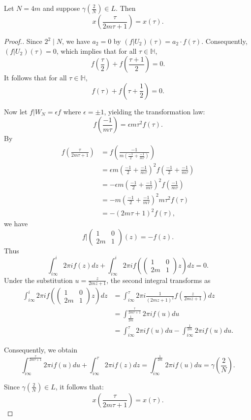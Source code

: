 \documentclass[10pt,a4paper]{amsart}
\begin{document}
\begin{lemma}
Let $N = 4m$ and suppose $\gamma\left(\frac{2}{N}\right) \in L$. Then
\begin{equation}
x\left(\frac{\tau}{2m\tau + 1}\right) = x(\tau).\end{equation}
\end{lemma}

\begin{proof}[Proof.]
Since $2^2 \mid N$, we have $a_2 = 0$  by $(f|U_2)(\tau) =
a_2\cdot f(\tau)$. Consequently,  $(f|U_2)(\tau) = 0$, which implies that for all $\tau \in \mathbb{H}$,
\[ f\left(\frac{\tau}{2}\right) + f\left(\frac{\tau + 1}{2}\right) = 0. \]
It follows that for all $\tau \in \mathbb{H}$,
\[ f(\tau) + f\left(\tau + \frac{1}{2}\right) = 0. \]

Now let $f|W_N = \epsilon f$ where $\epsilon = \pm 1$, yielding the transformation law:
\[ f\left(\frac{-1}{m\tau}\right) = \epsilon m\tau^2 f(\tau). \]
By
\begin{align*}
f\left(\frac{\tau}{2m\tau+1}\right) &= f\left(\frac{-1}{m\left(\frac{-1}{2} + \frac{-1}{m\tau}\right)}\right) \\
&= \epsilon m\left(\frac{-1}{2} + \frac{-1}{m\tau}\right)^2 f\left(\frac{-1}{2} + \frac{-1}{m\tau}\right) \\
&= -\epsilon m\left(\frac{-1}{2} + \frac{-1}{m\tau}\right)^2 f\left(\frac{-1}{m\tau}\right) \\
&= -m\left(\frac{-1}{2} + \frac{-1}{m\tau}\right)^2 m\tau^2 f(\tau) \\
&= -(2m\tau+1)^2 f(\tau),
\end{align*}
we have
\[f|\left( {\begin{array}{*{20}{c}}
  1&0 \\
  {2m}&1
\end{array}} \right)(z) =  - f(z).\]
Thus
\[ \int_{i\infty}^{i} 2\pi i f(z)dz + \int_{i\infty}^{i} 2\pi i f\left(\begin{pmatrix} 1 & 0 \\ 2m & 1 \end{pmatrix}z\right) dz = 0. \]
Under the substitution $u = \frac{z}{2mz+1}$, the second integral transforms as
\begin{align*}
\int_{i\infty}^{i} 2\pi i f\left(\begin{pmatrix} 1 & 0 \\ 2m & 1 \end{pmatrix}z\right) dz
& =\int_{i\infty}^{\tau} 2\pi i \frac{1}{(2mz+1)^2} f\left(\frac{z}{2mz+1}\right) dz\\
&= \int_{\frac{1}{2m}}^{\frac{\tau}{2m\tau+1}} 2\pi i f(u) du \\
&= \int_{i\infty}^{\tau} 2\pi i f(u) du - \int_{i\infty}^{\frac{1}{2m}} 2\pi i f(u) du.
\end{align*}

Consequently, we obtain
\[
\int_{i\infty}^{\frac{\tau}{2m\tau+1}} 2\pi i f(u) du + \int_{i\infty}^{\tau} 2\pi i f(z) dz = \int_{i\infty}^{\frac{1}{2m}} 2\pi i f(u) du = \gamma\left(\frac{2}{N}\right).
\]

Since $\gamma\left(\frac{2}{N}\right) \in L$, it follows that:
\[
x\left(\frac{\tau}{2m\tau+1}\right) = x(\tau).
\]
\end{proof}
\end{document}
